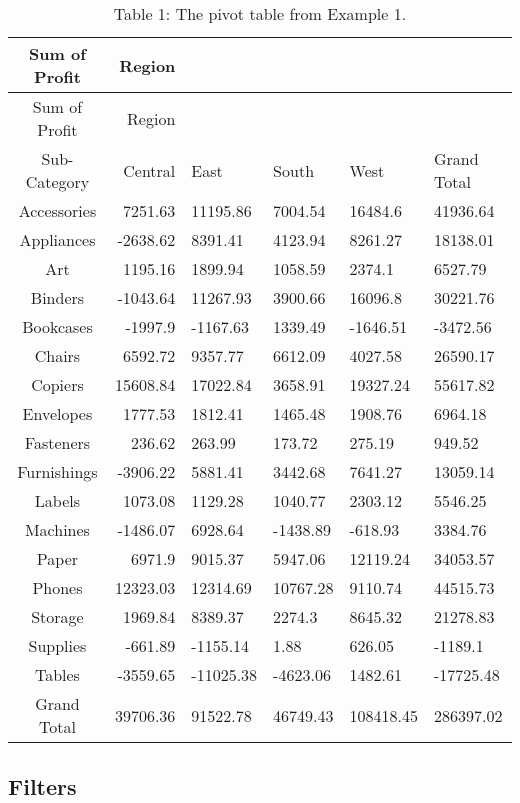\documentclass[
]{article}
\theoremstyle{definition}
\theoremstyle{definition}
\theoremstyle{definition}
\theoremstyle{definition}
\theoremstyle{remark}
\begin{document}
\hypertarget{Table1}{}
\begin{longtable}[]{@{}crllll@{}}
\caption{Table 1: The pivot table from Example 1.}\tabularnewline
\toprule
Sum of Profit & Region & & & & \\
\midrule
\endfirsthead
\toprule
Sum of Profit & Region & & & & \\
\midrule
\endhead
Sub-Category & Central & East & South & West & Grand Total \\
Accessories & 7251.63 & 11195.86 & 7004.54 & 16484.6 & 41936.64 \\
Appliances & -2638.62 & 8391.41 & 4123.94 & 8261.27 & 18138.01 \\
Art & 1195.16 & 1899.94 & 1058.59 & 2374.1 & 6527.79 \\
Binders & -1043.64 & 11267.93 & 3900.66 & 16096.8 & 30221.76 \\
Bookcases & -1997.9 & -1167.63 & 1339.49 & -1646.51 & -3472.56 \\
Chairs & 6592.72 & 9357.77 & 6612.09 & 4027.58 & 26590.17 \\
Copiers & 15608.84 & 17022.84 & 3658.91 & 19327.24 & 55617.82 \\
Envelopes & 1777.53 & 1812.41 & 1465.48 & 1908.76 & 6964.18 \\
Fasteners & 236.62 & 263.99 & 173.72 & 275.19 & 949.52 \\
Furnishings & -3906.22 & 5881.41 & 3442.68 & 7641.27 & 13059.14 \\
Labels & 1073.08 & 1129.28 & 1040.77 & 2303.12 & 5546.25 \\
Machines & -1486.07 & 6928.64 & -1438.89 & -618.93 & 3384.76 \\
Paper & 6971.9 & 9015.37 & 5947.06 & 12119.24 & 34053.57 \\
Phones & 12323.03 & 12314.69 & 10767.28 & 9110.74 & 44515.73 \\
Storage & 1969.84 & 8389.37 & 2274.3 & 8645.32 & 21278.83 \\
Supplies & -661.89 & -1155.14 & 1.88 & 626.05 & -1189.1 \\
Tables & -3559.65 & -11025.38 & -4623.06 & 1482.61 & -17725.48 \\
Grand Total & 39706.36 & 91522.78 & 46749.43 & 108418.45 & 286397.02 \\
\bottomrule
\end{longtable}

\hypertarget{filters}{%
\subsection{Filters}\label{filters}}
\end{document}
